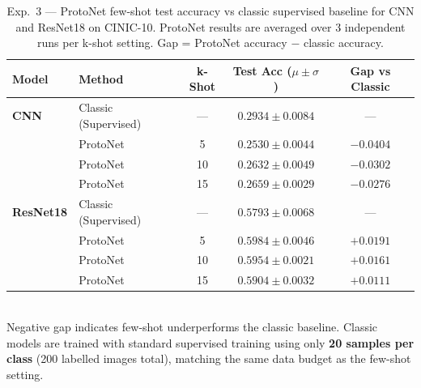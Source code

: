 \begin{table}[H]
\centering
\caption{Exp.\ 3 --- ProtoNet few-shot test accuracy vs classic supervised baseline for CNN and ResNet18 on CINIC-10. ProtoNet results are averaged over 3 independent runs per k-shot setting. Gap = ProtoNet accuracy $-$ classic accuracy.}
\label{tab:exp3_fewshot}
\small
\begin{tabular}{llccc}
\toprule
\textbf{Model} & \textbf{Method} & \textbf{k-Shot} & \textbf{Test Acc} ($\mu\pm\sigma$) & \textbf{Gap vs Classic} \\
\midrule
\textbf{CNN} & Classic (Supervised) & --- & $0.2934 \pm 0.0084$ & --- \\
\midrule
 & ProtoNet & 5 & $0.2530 \pm 0.0044$ & $-0.0404$ \\
 & ProtoNet & 10 & $0.2632 \pm 0.0049$ & $-0.0302$ \\
 & ProtoNet & 15 & $0.2659 \pm 0.0029$ & $-0.0276$ \\
\midrule
\textbf{ResNet18} & Classic (Supervised) & --- & $0.5793 \pm 0.0068$ & --- \\
\midrule
 & ProtoNet & 5 & $0.5984 \pm 0.0046$ & $+0.0191$ \\
 & ProtoNet & 10 & $0.5954 \pm 0.0021$ & $+0.0161$ \\
 & ProtoNet & 15 & $0.5904 \pm 0.0032$ & $+0.0111$ \\
\midrule
\bottomrule
\end{tabular}
\\[4pt]\footnotesize Negative gap indicates few-shot underperforms the classic baseline. Classic models are trained with standard supervised training using only \textbf{20 samples per class} (200 labelled images total), matching the same data budget as the few-shot setting.
\end{table}
